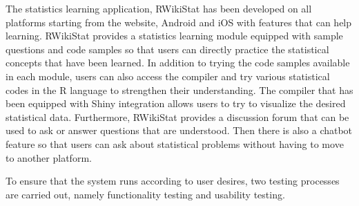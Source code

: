 \documentclass[conference,a4paper]{IEEEtran}
\begin{document}
The statistics learning application, RWikiStat has been developed on all platforms starting from the website, Android and iOS with features that can help learning. RWikiStat provides a statistics learning module equipped with sample questions and code samples so that users can directly practice the statistical concepts that have been learned. In addition to trying the code samples available in each module, users can also access the compiler and try various statistical codes in the R language to strengthen their understanding. The compiler that has been equipped with Shiny integration allows users to try to visualize the desired statistical data. Furthermore, RWikiStat provides a discussion forum that can be used to ask or answer questions that are understood. Then there is also a chatbot feature so that users can ask about statistical problems without having to move to another platform.

To ensure that the system runs according to user desires, two testing processes are carried out, namely functionality testing and usability testing.
\end{document}
